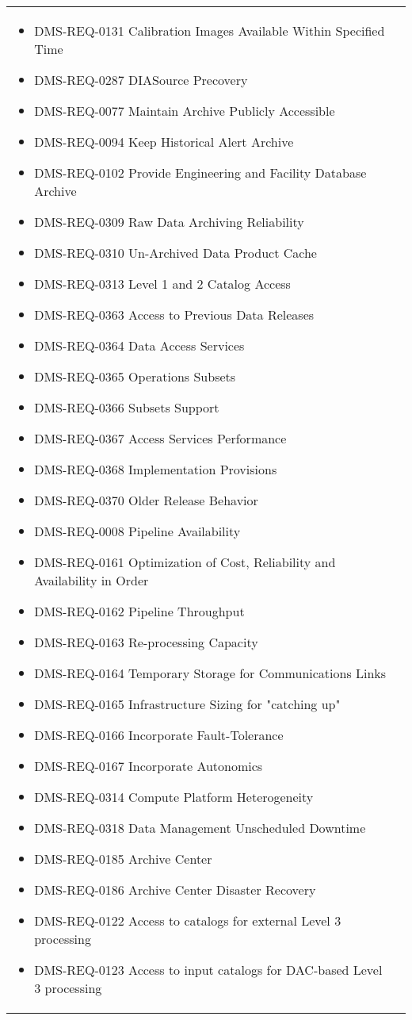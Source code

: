 \begin{xtabular}{lp{0.7\textwidth}}
\begin{itemize}
\item DMS-REQ-0131 Calibration Images Available Within Specified Time
\item DMS-REQ-0287 DIASource Precovery
\item DMS-REQ-0077 Maintain Archive Publicly Accessible
\item DMS-REQ-0094 Keep Historical Alert Archive
\item DMS-REQ-0102 Provide Engineering and Facility Database Archive
\item DMS-REQ-0309 Raw Data Archiving Reliability
\item DMS-REQ-0310 Un-Archived Data Product Cache
\item DMS-REQ-0313 Level 1 and 2 Catalog Access
\item DMS-REQ-0363 Access to Previous Data Releases
\item DMS-REQ-0364 Data Access Services
\item DMS-REQ-0365 Operations Subsets
\item DMS-REQ-0366 Subsets Support
\item DMS-REQ-0367 Access Services Performance
\item DMS-REQ-0368 Implementation Provisions
\item DMS-REQ-0370 Older Release Behavior
\item DMS-REQ-0008 Pipeline Availability
\item DMS-REQ-0161 Optimization of Cost, Reliability and Availability in Order
\item DMS-REQ-0162 Pipeline Throughput
\item DMS-REQ-0163 Re-processing Capacity
\item DMS-REQ-0164 Temporary Storage for Communications Links
\item DMS-REQ-0165 Infrastructure Sizing for "catching up"
\item DMS-REQ-0166 Incorporate Fault-Tolerance
\item DMS-REQ-0167 Incorporate Autonomics
\item DMS-REQ-0314 Compute Platform Heterogeneity
\item DMS-REQ-0318 Data Management Unscheduled Downtime
\item DMS-REQ-0185 Archive Center
\item DMS-REQ-0186 Archive Center Disaster Recovery
\item DMS-REQ-0122 Access to catalogs for external Level 3 processing
\item DMS-REQ-0123 Access to input catalogs for DAC-based Level 3 processing

\end{itemize}
\end{xtabular}
